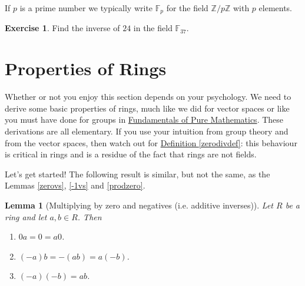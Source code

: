 \documentclass[11pt]{amsbook}
\newtheorem{lemma}[theorem]{Lemma}
\theoremstyle{definition}
\newtheorem{exercise}{Exercise}
\begin{document}
If $p$ is a prime number we typically write $\mathbb{F}_p$ for the field $\mathbb{Z}/p\mathbb{Z}$ with $p$ elements.

\begin{exercise}
Find the inverse of $24$ in the field $\mathbb{F}_{37}$.
\end{exercise}

\section{Properties of Rings}
Whether or not you enjoy this section depends on your psychology. We need to derive some basic properties of rings, much like we did for vector spaces or like you must have done for groups in \href{http://www.drps.ed.ac.uk/12-13/dpt/cxmath08064.htm}{Fundamentals of Pure Mathematics}. These derivations are all elementary. If you use your intuition from group theory and from the vector spaces, then watch out for \hyperref[zerodivdef]{Definition \ref{zerodivdef}}: this behaviour is critical in rings and is a residue of the fact that rings are not fields.
\medskip

Let's get started! The following result is similar, but not the same, as the Lemmas \ref{zerovs}, \ref{-1vs} and \ref{prodzero}.
\begin{lemma}[Multiplying by zero and negatives (i.e. additive inverses)] \label{zeroinring} Let $R$ be a ring and let $a,b\in R$. Then
\begin{enumerate}
\item $0a = 0 = a0$.
\item $(-a)b = - (ab) = a(-b)$.
\item $(-a)(-b) = ab$.
\end{enumerate}
\end{lemma}
\end{document}
